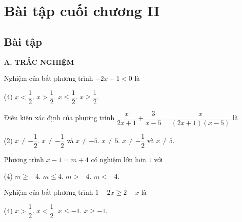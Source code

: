 %

\section*{Bài tập cuối chương II}

\begin{exercises}
    \subsection{Bài tập}

    \textbf{A. TRẮC NGHIỆM}

    \begin{questions}[resume=SGK]
        \item Nghiệm của bất phương trình $-2x+1<0$ là
        \begin{tasks}[label=\Alph*.](4)
            \task $x<\dfrac{1}{2}$.
            \task $x>\dfrac{1}{2}$.
            \task $x\leq\dfrac{1}{2}$.
            \task $x\geq\dfrac{1}{2}$.
        \end{tasks}

        \item Điều kiện xác định của phương trình $\dfrac{x}{2x+1}+\dfrac{3}{x-5}=\dfrac{x}{(2x+1)(x-5)}$ là
        \begin{tasks}[label=\Alph*.](2)
            \task $x\ne-\dfrac{1}{2}$.
            \task $x\ne-\dfrac{1}{2}$ và $x\ne-5$.
            \task $x\ne5$.
            \task $x\ne-\dfrac{1}{2}$ và $x\ne5$.
        \end{tasks}

        \item Phương trình $x-1=m+4$ có nghiệm lớn hơn $1$ với
        \begin{tasks}[label=\Alph*.](4)
            \task $m\geq-4$.
            \task $m\leq4$.
            \task $m>-4$.
            \task $m<-4$.
        \end{tasks}

        \item Nghiệm của bất phương trình $1-2x\geq2-x$ là
        \begin{tasks}[label=\Alph*.](4)
            \task $x>\dfrac{1}{2}$.
            \task $x<\dfrac{1}{2}$.
            \task $x\leq-1$.
            \task $x\geq-1$.
        \end{tasks}


\end{questions}
\end{exercises}
